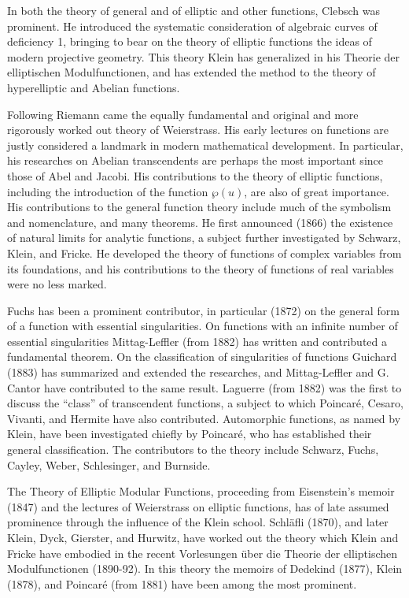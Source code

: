 \documentclass[oneside]{book}
\begin{document}
{In both the theory of general and of elliptic and other functions,
Clebsch was prominent. He introduced the systematic consideration
of algebraic curves of deficiency 1, bringing to bear on the theory
of elliptic functions the ideas of modern projective geometry. This
theory Klein has generalized in his Theorie der elliptischen
Modulfunctionen, and has extended the method to the theory of
hyperelliptic and Abelian functions.

Following Riemann came the equally fundamental and original and more
rigorously worked out theory of Weierstrass. His early lectures on
functions are justly considered a landmark in modern mathematical
development. In particular, his researches on Abelian transcendents
are perhaps the most important since those of Abel and Jacobi. His
contributions to the theory of elliptic functions, including the
introduction of the function $\wp(u)$, are also of great
importance. His contributions to the general function theory
include much of the symbolism and nomenclature, and many
theorems. He first announced (1866) the existence of natural limits
for analytic functions, a subject further investigated by Schwarz,
Klein, and Fricke. He developed the theory of functions of complex
variables from its foundations, and his contributions to the theory
of functions of real variables were no less marked.

Fuchs has been a prominent contributor, in particular (1872) on the
general form of a function with essential singularities. On
functions with an infinite number of essential singularities
Mittag-Leffler (from 1882) has written and contributed a fundamental
theorem. On the classification of singularities of functions
Guichard (1883) has summarized and extended the researches, and
Mittag-Leffler and G. Cantor have contributed to the same
result. Laguerre (from 1882) was the first to discuss the ``class''
of transcendent functions, a subject to which Poincar\'e, Cesaro,
Vivanti, and Hermite have also contributed. Automorphic functions,
as named by Klein, have been investigated chiefly by Poincar\'e, who
has established their general classification. The contributors to
the theory include Schwarz, Fuchs, Cayley, Weber, Schlesinger, and
Burnside.

The Theory of Elliptic Modular Functions, proceeding from
Eisenstein's memoir (1847) and the lectures of Weierstrass on
elliptic functions, has of late assumed prominence through the
influence of the Klein school. Schl\"afli (1870), and later Klein,
Dyck, Gierster, and Hurwitz, have worked out the theory which Klein
and Fricke have embodied in the recent Vorlesungen
\"uber die Theorie der elliptischen Modulfunctionen
(1890-92). In this theory the memoirs of Dedekind (1877), Klein
(1878), and Poincar\'e (from 1881) have been among the most
prominent.

}
\end{document}
